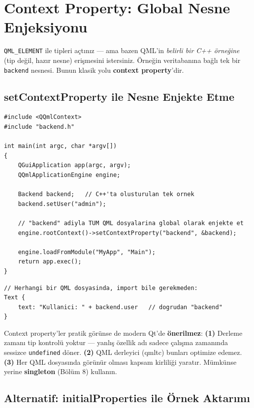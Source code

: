 \documentclass[11pt,a4paper]{article}
\newcommand{\kod}[1]{\texttt{\color{koyuGri}#1}}
\begin{document}
\section{Context Property: Global Nesne Enjeksiyonu}

\kod{QML\_ELEMENT} ile tipleri açtınız — ama bazen QML'in \emph{belirli bir C++
örneğine} (tip değil, hazır nesne) erişmesini istersiniz. Örneğin veritabanına
bağlı tek bir \kod{backend} nesnesi. Bunun klasik yolu \textbf{context property}'dir.

\subsection{setContextProperty ile Nesne Enjekte Etme}

\begin{lstlisting}
#include <QQmlContext>
#include "backend.h"

int main(int argc, char *argv[])
{
    QGuiApplication app(argc, argv);
    QQmlApplicationEngine engine;

    Backend backend;   // C++'ta olusturulan tek ornek
    backend.setUser("admin");

    // "backend" adiyla TUM QML dosyalarina global olarak enjekte et
    engine.rootContext()->setContextProperty("backend", &backend);

    engine.loadFromModule("MyApp", "Main");
    return app.exec();
}
\end{lstlisting}

\begin{lstlisting}[style=qmlstyle]
// Herhangi bir QML dosyasinda, import bile gerekmeden:
Text {
    text: "Kullanici: " + backend.user   // dogrudan "backend"
}
\end{lstlisting}

\begin{uyarikutu}
Context property'ler pratik görünse de modern Qt'de \textbf{önerilmez}:
\textbf{(1)} Derleme zamanı tip kontrolü yoktur — yanlış özellik adı sadece
çalışma zamanında sessizce \kod{undefined} döner. \textbf{(2)} QML derleyici
(qmltc) bunları optimize edemez. \textbf{(3)} Her QML dosyasında görünür olması
kapsam kirliliği yaratır. Mümkünse yerine \textbf{singleton} (Bölüm 8) kullanın.
\end{uyarikutu}

\subsection{Alternatif: initialProperties ile Örnek Aktarımı}
\end{document}
